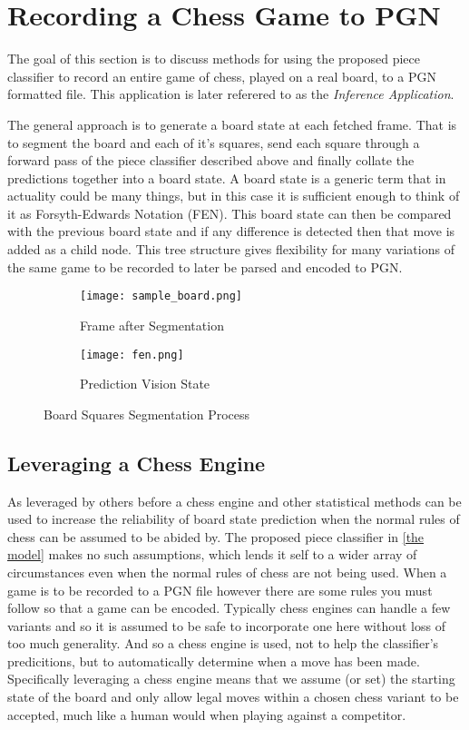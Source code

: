 \section{Recording a Chess Game to PGN}
\label{inference}
The goal of this section is to discuss methods for using the proposed piece classifier to record an entire game of chess, played on a real board, 
to a PGN formatted file.  This application is later referered to as the \textit{Inference Application}.

The general approach is to generate a board state at each fetched frame.  That is to segment the board and each of it's squares, send each square 
through a forward pass of the piece classifier described above and finally collate the predictions together into a board state.  A board state is 
a generic term that in actuality could be many things, but in this case it is sufficient enough to think of it as Forsyth-Edwards Notation (FEN).
This board state can then be compared with the previous board state and if any difference is detected then that move is added as a child node.
This tree structure gives flexibility for many variations of the same game to be recorded to later be parsed and encoded to PGN.


\begin{figure}[h]
    \centering
    \begin{subfigure}[b]{0.48\textwidth}
        \centering
        \texttt{[image: sample\_board.png]}
        \caption{Frame after Segmentation}
    \end{subfigure}
    \hfill
    \begin{subfigure}[b]{0.48\textwidth}
        \centering
        \texttt{[image: fen.png]}
        \caption{Prediction Vision State}
    \end{subfigure}
\caption{Board Squares Segmentation Process}
\label{fig:visionstate}
\end{figure}

\subsection{Leveraging a Chess Engine}
As leveraged by others before a chess engine and other statistical methods can be used to increase the reliability of board state 
prediction when the normal rules of chess can be assumed to be abided by.  The proposed piece classifier in \ref{the model} makes no such assumptions, which
lends it self to a wider array of circumstances even when the normal rules of chess are not being used.
When a game is to be recorded to a PGN file however there are some rules you must follow so that a game can be encoded.  Typically chess engines can handle a few
variants and so it is assumed to be safe to incorporate one here without loss of too much generality.  And so a chess engine is used, not to help the 
classifier's predicitions, but to automatically determine when a move has been made.
Specifically leveraging a chess engine means that we assume (or set) the starting state of the board and only allow legal moves within a chosen chess variant to be 
accepted, much like a human would when playing against a competitor.  

